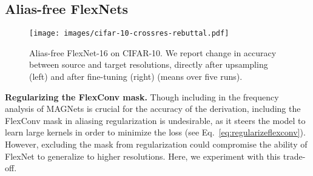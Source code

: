 \documentclass{article} \usepackage{iclr2022_conference,times}
\begin{document}
\subsection{Alias-free FlexNets}
\label{sec:crossresexperiments}
\vspace{-1mm}
\begin{figure}[t]
        \centering
    \texttt{[image: images/cifar-10-crossres-rebuttal.pdf]}
    \vspace{-6mm}
    \caption{Alias-free FlexNet-16 on CIFAR-10. We report change in accuracy between source and target resolutions, directly after upsampling (left) and after fine-tuning (right) (means over five runs).
    \vspace{-5mm}}
    \vspace{-2mm}
    \label{fig:c10-crossres}
\end{figure}

\textbf{Regularizing the FlexConv mask.} Though including  in the frequency analysis of MAGNets is crucial for the accuracy of the derivation, including the FlexConv mask in aliasing regularization is undesirable, as it steers the model to learn large kernels in order to minimize the loss (see Eq.~\ref{eq:regularizeflexconv}). However, excluding the mask from regularization could compromise the ability of FlexNet to generalize to higher resolutions. Here, we experiment with this trade-off.

\newlength{\oldintextsep}
\setlength{\oldintextsep}{\intextsep}
\end{document}
